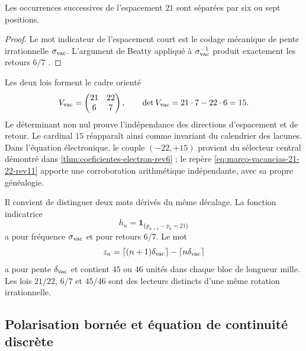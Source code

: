 \begin{corollary}
\label{cor:ley-retorno-vacancias-rev11}
Les occurrences successives de l'espacement \(21\) sont séparées par six ou
sept positions.
\end{corollary}

\begin{proof}
Le mot indicateur de l'espacement court est le codage mécanique de
pente irrationnelle \(\sigma_{\rm vac}\). L'argument de Beatty appliqué à
\(\sigma_{\rm vac}^{-1}\) produit exactement les retours \(6/7\)
\cite{Lothaire2002}.
\end{proof}

Les deux lois forment le cadre orienté
\begin{equation}
 V_{\rm vac}=
 \begin{pmatrix}21&22\\6&7\end{pmatrix},
 \qquad
 \det V_{\rm vac}=21\cdot7-22\cdot6=15.
 \label{eq:marco-vacancias-21-22-rev11}
\end{equation}
Le déterminant non nul prouve l'indépendance des directions
d'espacement et de retour. Le cardinal \(15\) réapparaît ainsi comme invariant du
calendrier des lacunes. Dans l'équation électronique, le couple
\((-22,+15)\) provient du sélecteur central démontré dans
\cref{thm:coeficientes-electron-rev6} ; le repère
\eqref{eq:marco-vacancias-21-22-rev11} apporte une corroboration arithmétique
indépendante, avec sa propre généalogie.

Il convient de distinguer deux mots dérivés du même décalage. La
fonction indicatrice
\[
 h_n=\mathbf 1_{\{p_{n+1}-p_n=21\}}
\]
a pour fréquence \(\sigma_{\rm vac}\) et pour retours \(6/7\). Le mot
\[
 z_n=\lceil(n+1)\delta_{\rm vac}\rceil
      -\lceil n\delta_{\rm vac}\rceil
\]
a pour pente \(\delta_{\rm vac}\) et contient \(45\) ou \(46\) unités
dans chaque bloc de longueur mille. Les lois \(21/22\), \(6/7\) et \(45/46\)
sont des lecteurs distincts d'une même rotation irrationnelle.

\subsection{Polarisation bornée et équation de continuité discrète}

